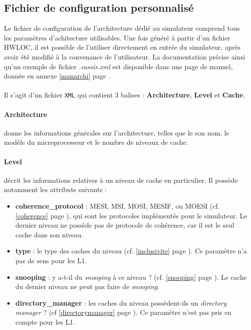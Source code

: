 \subsection{Fichier de configuration personnalisé}
\label{config}
Le fichier de configuration de l'architecture dédié au simulateur comprend tous les paramètres d'achitecture utilisables. Une fois généré à partir d'un fichier \textsf{HWLOC}, il est possible de l'utiliser directement en entrée du simulateur, après avoir été modifié à la convenance de l'utilisateur. La documentation précise ainsi qu'un exemple de fichier \textit{.cassis.xml} est disponible dans une page de manuel, donnée en annexe \ref{manarchi} page \pageref{manarchi}.

\paragraph{}
Il s'agit d'un fichier \texttt{XML} qui contient 3 balises : \textbf{Architecture}, \textbf{Level} et \textbf{Cache}.

\paragraph{Architecture} donne les informations générales sur l'architecture, telles que le son nom, le modèle du microprocesseur et le nombre de niveaux de cache.

\paragraph{Level} décrit les informations relatives à un niveau de cache en particulier. Il possède notamment les attributs suivants :
\begin{itemize}
  \item \textbf{coherence\_protocol} : MESI, MSI, MOSI, MESIF, ou MOESI (cf. \ref{coherence} page \pageref{coherence}), qui sont les protocoles implémentés pour le simulateur. Le dernier niveau ne possède pas de protocole de cohérence, car il est le seul cache dans son niveau.
  \item \textbf{type} : le type des caches du niveau (cf. \ref{inclusivite} page \pageref{inclusivite}). Ce paramètre n'a pas de sens pour les L1.
  \item \textbf{snooping} : y a-t-il du \emph{snooping} à ce niveau ? (cf. \ref{snooping} page \pageref{snooping}). Le cache du dernier niveau ne peut pas faire de \emph{snooping}.
  \item \textbf{directory\_manager} : les caches du niveau possèdent-ils un \emph{directory manager} ? (cf \ref{directorymanager} page \pageref{directorymanager}). Ce paramètre n'est pas pris en compte pour les L1.
\end{itemize}

